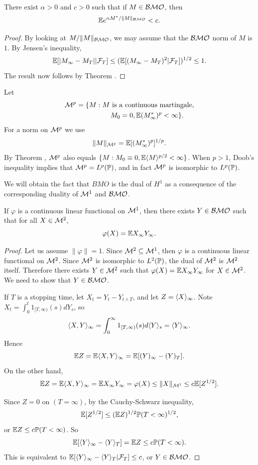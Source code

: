 \begin{proposition}\label{prop:ch4_7.2}
There exist $\alpha > 0$ and $c > 0$ such that if $M \in \BMO$, then
\[
    \E e^{\alpha M^*/\|M\|_{\BMO}} < c.
\]
\end{proposition}

\begin{proof}
By looking at $M/\|M\|_{\BMO}$, we may assume that the $\BMO$ norm of $M$ is $1$. By Jensen's inequality,
\[
    \E[|M_\infty - M_T||\FC_T] \leq (\E[(M_\infty - M_T)^2|\FC_T])^{1/2} \leq 1.
\]
The result now follows by Theorem .
\end{proof}

Let
\begin{align}\label{eq:ch4_7.3}
    \MC^p = \{M &: M~\text{is a continuous martingale}, \\
    &\qquad M_0 = 0, \E(M_\infty^*)^p < \infty\}. \notag
\end{align}
For a norm on $\MC^p$ we use
\[
    \|M\|_{\MC^p} = \E[(M_\infty^*)^p]^{1/p}.
\]
By Theorem , $\MC^p$ also equals $\{M : M_0 \equiv 0, \E\lrang{M}^{p/2} < \infty\}$. When $p > 1$, Doob's inequality implies that $\MC^p = L^p(\P)$, and in fact $\MC^p$ is isomorphic to $L^p(\P)$.


We will obtain the fact that $BMO$ is the dual of $H^1$ as a consequence of the corresponding duality of $\MC^1$ and $\BMO$.

\begin{proposition}\label{prop:ch4_7.3}
If $\varphi$ is a continuous linear functional on $\MC^1$, then there exists $Y \in \BMO$ such that for all $X \in \MC^2$,
\[
    \varphi(X) = \E X_\infty Y_\infty.
\]
\end{proposition}

\begin{proof}
Let us assume $\|\varphi\| = 1$. Since $\MC^2 \subseteq \MC^1$, then $\varphi$ is a continuous linear functional on $\MC^2$. Since $\MC^2$ is isomorphic to $L^2(\P)$, the dual of $\MC^2$ is $\MC^2$ itself. Therefore there exists $Y \in \MC^2$ such that $\varphi(X) = \E X_\infty Y_\infty$ for $X \in \MC^2$. We need to show that $Y \in \BMO$.

If $T$ is a stopping time, let $X_t = Y_t - Y_{t\wedge T}$, and let $Z = \lrang{X}_\infty$. Note $X_t = \int_0^t 1_{[T,\infty)}(s)dY_s$, so
\[
    \lrang{X,Y}_\infty = \int_0^\infty 1_{[T,\infty)}(s)d\lrang{Y}_s = \lrang{Y}_\infty.
\]
Hence
\[
    \E Z = \E\lrang{X,Y}_\infty = \E[(Y)_\infty - (Y)_T].
\]
On the other hand,
\mpagebreak
\[
    \E Z = \E\lrang{X,Y}_\infty = \E X_\infty Y_\infty = \varphi(X) \leq \|X\|_{\MC^1} \leq c\E[Z^{1/2}].
\]

Since $Z = 0$ on $(T = \infty)$, by the Cauchy-Schwarz inequality,
\[
    \E[Z^{1/2}] \leq (\E Z)^{1/2}\P(T < \infty)^{1/2},
\]
or $\E Z \leq c\P(T < \infty)$. So
\[
    \E[\lrang{Y}_\infty - \lrang{Y}_T] = \E Z \leq c\P(T < \infty).
\]
This is equivalent to $\E[\lrang{Y}_\infty - \lrang{Y}_T\mid \FC_T] \leq c$, or $Y \in \BMO$.
\end{proof}


